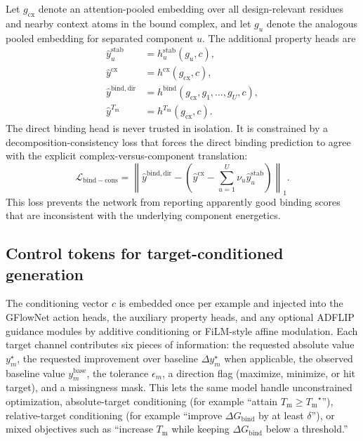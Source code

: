 \documentclass[11pt]{article}
\newcommand{\Tm}{\ensuremath{T_{\mathrm m}}}
\newcommand{\DGbind}{\ensuremath{\Delta G_{\mathrm{bind}}}}
\begin{document}
Let $g_{\mathrm{cx}}$ denote an attention-pooled embedding over all design-relevant residues and nearby context atoms in the bound complex, and let $g_u$ denote the analogous pooled embedding for separated component $u$. The additional property heads are
\begin{align}
    \widehat y^{\mathrm{stab}}_{u} &= h^{\mathrm{stab}}_u(g_u,c),\\
    \widehat y^{\mathrm{cx}} &= h^{\mathrm{cx}}(g_{\mathrm{cx}},c),\\
    \widehat y^{\mathrm{bind,dir}} &= h^{\mathrm{bind}}(g_{\mathrm{cx}},g_1,\ldots,g_U,c),\\
    \widehat y^{\Tm} &= h^{\Tm}(g_{\mathrm{cx}},c).
\end{align}
The direct binding head is never trusted in isolation. It is constrained by a decomposition-consistency loss that forces the direct binding prediction to agree with the explicit complex-versus-component translation:
\begin{equation}
\label{eq:bindcons}
    \mathcal{L}_{\mathrm{bind-cons}} = \left\lVert \widehat y^{\mathrm{bind,dir}} - \left(\widehat y^{\mathrm{cx}} - \sum_{u=1}^{U}\nu_u\widehat y^{\mathrm{stab}}_{u}\right) \right\rVert_1.
\end{equation}
This loss prevents the network from reporting apparently good binding scores that are inconsistent with the underlying component energetics.


\subsection{Control tokens for target-conditioned generation}

The conditioning vector $c$ is embedded once per example and injected into the GFlowNet action heads, the auxiliary property heads, and any optional ADFLIP guidance modules by additive conditioning or FiLM-style affine modulation. Each target channel contributes six pieces of information: the requested absolute value $y_m^{\star}$, the requested improvement over baseline $\Delta y_m^{\star}$ when applicable, the observed baseline value $y_m^{\mathrm{base}}$, the tolerance $\epsilon_m$, a direction flag (maximize, minimize, or hit target), and a missingness mask. This lets the same model handle unconstrained optimization, absolute-target conditioning (for example ``attain $\Tm\ge \Tm^\star$''), relative-target conditioning (for example ``improve $\DGbind$ by at least $\delta$''), or mixed objectives such as ``increase $\Tm$ while keeping \DGbind{} below a threshold.''
\end{document}
